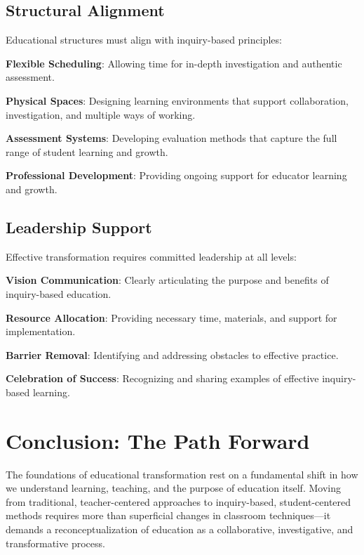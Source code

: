 \documentclass[
  Letterpaper,
]{scrbook}
\begin{document}
\subsection{Structural Alignment}\label{structural-alignment}

Educational structures must align with inquiry-based principles:

\textbf{Flexible Scheduling}: Allowing time for in-depth investigation
and authentic assessment.

\textbf{Physical Spaces}: Designing learning environments that support
collaboration, investigation, and multiple ways of working.

\textbf{Assessment Systems}: Developing evaluation methods that capture
the full range of student learning and growth.

\textbf{Professional Development}: Providing ongoing support for
educator learning and growth.

\subsection{Leadership Support}\label{leadership-support}

Effective transformation requires committed leadership at all levels:

\textbf{Vision Communication}: Clearly articulating the purpose and
benefits of inquiry-based education.

\textbf{Resource Allocation}: Providing necessary time, materials, and
support for implementation.

\textbf{Barrier Removal}: Identifying and addressing obstacles to
effective practice.

\textbf{Celebration of Success}: Recognizing and sharing examples of
effective inquiry-based learning.

\section{Conclusion: The Path
Forward}\label{conclusion-the-path-forward}

The foundations of educational transformation rest on a fundamental
shift in how we understand learning, teaching, and the purpose of
education itself. Moving from traditional, teacher-centered approaches
to inquiry-based, student-centered methods requires more than
superficial changes in classroom techniques---it demands a
reconceptualization of education as a collaborative, investigative, and
transformative process.
\end{document}
